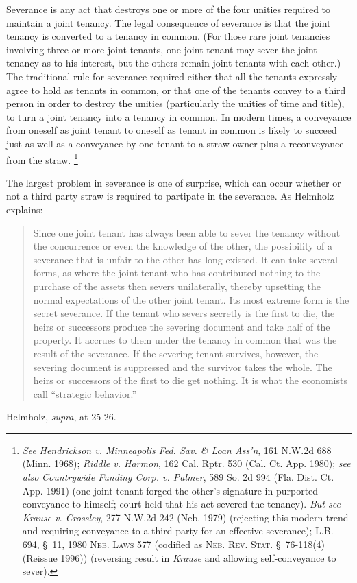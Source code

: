 Severance is any act that destroys one or more of the four unities required to
maintain a joint tenancy. The legal consequence of severance is that the joint
tenancy is converted to a tenancy in common. (For those rare joint tenancies
involving three or more joint tenants, one joint tenant may sever the joint
tenancy as to his interest, but the others remain joint tenants with each
other.) The traditional rule for severance required either that all the tenants
expressly agree to hold as tenants in common, or that one of the tenants convey
to a third person in order to destroy the unities (particularly the unities of
time and title), to turn a joint tenancy into a tenancy in common. In modern
times, a conveyance from oneself as joint tenant to oneself as tenant in common
is likely to succeed just as well as a conveyance by one tenant to a straw owner
plus a reconveyance from the straw. \footnote{\textit{See} \emph{Hendrickson v.
Minneapolis Fed. Sav. \& Loan Ass'n}, 161 N.W.2d 688 (Minn. 1968); \emph{Riddle
v. Harmon}, 162 Cal. Rptr. 530 (Cal. Ct. App. 1980); \textit{see also}
\emph{Countrywide Funding Corp. v. Palmer}, 589 So. 2d 994 (Fla. Dist. Ct. App.
1991) (one joint tenant forged the other's signature in purported conveyance to
himself; court held that his act severed the tenancy). \textit{But see}
\emph{Krause v. Crossley}, 277 N.W.2d 242 (Neb. 1979) (rejecting this modern
trend and requiring conveyance to a third party for an effective severance);
L.B. 694, \S~11, 1980 \textsc{Neb. Laws} 577 (codified as \textsc{Neb. Rev.
Stat.} \S~76-118(4) (Reissue 1996)) (reversing result in \textit{Krause} and
allowing self-conveyance to sever).}

The largest problem in severance is one of surprise, which can occur whether or
not a third party straw is required to partipate in the severance. As Helmholz
explains:
\begin{quote}
Since one joint tenant has always been able to sever the tenancy without the
concurrence or even the knowledge of the other, the possibility of a severance
that is unfair to the other has long existed. It can take several forms, as
where the joint tenant who has contributed nothing to the purchase of the
assets then severs unilaterally, thereby upsetting the normal expectations of
the other joint tenant. Its most extreme form is the secret severance. If the
tenant who severs secretly is the first to die, the heirs or successors produce
the severing document and take half of the property. It accrues to them under
the tenancy in common that was the result of the severance. If the severing
tenant survives, however, the severing document is suppressed and the survivor
takes the whole. The heirs or successors of the first to die get nothing. It is
what the economists call ``strategic behavior.''
\end{quote}
Helmholz, \textit{supra}, at 25-26.

